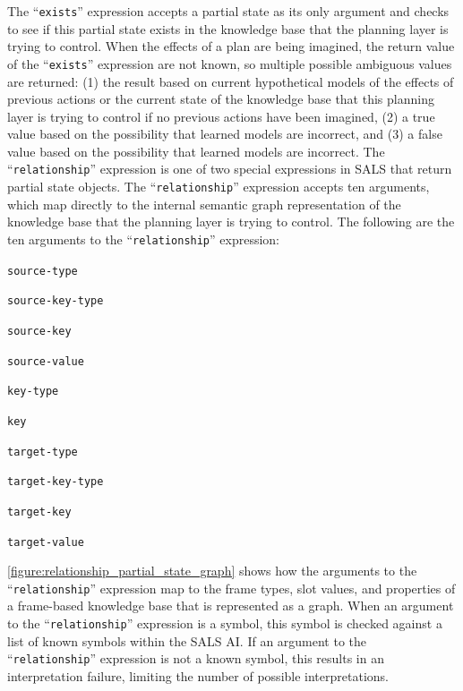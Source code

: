 The ``{\tt{exists}}'' expression accepts a partial state as its only
argument and checks to see if this partial state exists in the
knowledge base that the planning layer is trying to control.  When the
effects of a plan are being imagined, the return value of the
``{\tt{exists}}'' expression are not known, so multiple possible
ambiguous values are returned: (1) the result based on current
hypothetical models of the effects of previous actions or the current
state of the knowledge base that this planning layer is trying to
control if no previous actions have been imagined, (2) a true value
based on the possibility that learned models are incorrect, and (3) a
false value based on the possibility that learned models are
incorrect.  The ``{\tt{relationship}}'' expression is one of two
special expressions in SALS that return partial state objects.  The
``{\tt{relationship}}'' expression accepts ten arguments, which map
directly to the internal semantic graph representation of the
knowledge base that the planning layer is trying to control.  The
following are the ten arguments to the ``{\tt{relationship}}''
expression:
\begin{packed_enumerate}
\item{{\tt{source-type}}}
\item{{\tt{source-key-type}}}
\item{{\tt{source-key}}}
\item{{\tt{source-value}}}
\item{{\tt{key-type}}}
\item{{\tt{key}}}
\item{{\tt{target-type}}}
\item{{\tt{target-key-type}}}
\item{{\tt{target-key}}}
\item{{\tt{target-value}}}
\end{packed_enumerate}
{\mbox{\autoref{figure:relationship_partial_state_graph}}} shows how
the arguments to the ``{\tt{relationship}}'' expression map to the
frame types, slot values, and properties of a frame-based knowledge
base that is represented as a graph.  When an argument to the
``{\tt{relationship}}'' expression is a symbol, this symbol is checked
against a list of known symbols within the SALS AI.  If an argument to
the ``{\tt{relationship}}'' expression is not a known symbol, this
results in an interpretation failure, limiting the number of possible
interpretations.
